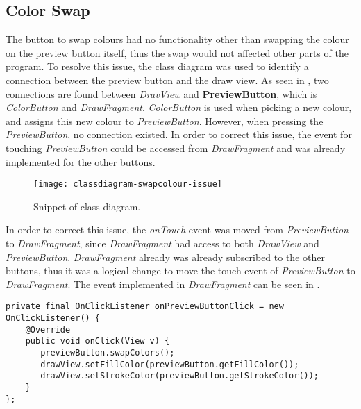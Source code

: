 \subsection{Color Swap}
The button to swap colours had no functionality other than swapping the colour on the preview button itself, thus the swap would not affected other parts of the program.
To resolve this issue, the class diagram was used to identify a connection between the preview button and the draw view.
As seen in , two connections are found between \textit{DravView} and \textbf{PreviewButton}, which is \textit{ColorButton} and \textit{DrawFragment}.
\textit{ColorButton} is used when picking a new colour, and assigns this new colour to \textit{PreviewButton}.
However, when pressing the \textit{PreviewButton}, no connection existed.
In order to correct this issue, the event for touching \textit{PreviewButton} could be accessed from \textit{DrawFragment} and was already implemented for the other buttons. 

\begin{figure}
     \texttt{[image: classdiagram-swapcolour-issue]}
     \caption{Snippet of class diagram.}\label{fig:clsdiagramsnippet}
\end{figure}

In order to correct this issue, the \textit{onTouch} event was moved from \textit{PreviewButton} to \textit{DrawFragment}, since \textit{DrawFragment} had access to both \textit{DrawView} and \textit{PreviewButton}.
\textit{DrawFragment} already was already subscribed to the other buttons, thus it was a logical change to move the touch event of \textit{PreviewButton} to \textit{DrawFragment}.
The event implemented in \textit{DrawFragment} can be seen in .

\begin{lstlisting}[caption={onPreviewButtonClick event},label=lst:event-previewbuttonclick]
private final OnClickListener onPreviewButtonClick = new OnClickListener() {
    @Override
    public void onClick(View v) {
       previewButton.swapColors();
       drawView.setFillColor(previewButton.getFillColor());
       drawView.setStrokeColor(previewButton.getStrokeColor());
    }
};
\end{lstlisting}